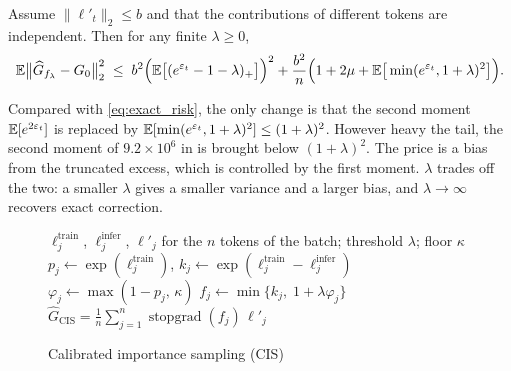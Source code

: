 \begin{theorem}[Informal]
\label{thm:cis_risk}
Assume $\|\ell'_t\|_2\le b$ and that the contributions of different tokens are
independent. Then for any finite $\lambda\ge0$,
\begin{equation}
\mathbb{E}\big\|\widehat G_{f_{\lambda}}-G_0\big\|_2^2
\;\le\;
b^2\Big(\mathbb{E}\big[(e^{\varepsilon_t}-1-\lambda)_+\big]\Big)^2
+\frac{b^2}{n}\Big(1+2\mu+\mathbb{E}\big[\min(e^{\varepsilon_t},1+\lambda)^2\big]\Big).
\label{eq:cis_risk}
\end{equation}
\end{theorem}

Compared with \eqref{eq:exact_risk}, the only change is that the second moment
$\mathbb{E}[e^{2\varepsilon_t}]$ is replaced by
$\mathbb{E}[\min(e^{\varepsilon_t},1+\lambda)^2]\le(1+\lambda)^2$. However heavy the
tail, the second moment of $9.2\times10^{6}$ in  is brought below
$(1+\lambda)^2$. The price is a bias from the truncated excess, which is
controlled by the first moment. $\lambda$ trades off the two: a smaller
$\lambda$ gives a smaller variance and a larger bias, and $\lambda\to\infty$
recovers exact correction.

\begin{figure}
\vspace{-\baselineskip}
\begin{minipage}{0.5\textwidth}
\begin{algorithm}[H]
\caption{Calibrated importance sampling (CIS)}
\label{alg:cis}
\begin{algorithmic}[1]
\Require $\ell^{\mathrm{train}}_j$, $\ell^{\mathrm{infer}}_j$, $\ell'_j$ for
the $n$ tokens of the batch; threshold $\lambda$; floor $\kappa$
  \State $p_j\gets\exp(\ell^{\mathrm{train}}_j)$,\quad
  $k_j\gets\exp(\ell^{\mathrm{train}}_j-\ell^{\mathrm{infer}}_j)$
  \State $\varphi_j\gets\max(1-p_j,\,\kappa)$
  \State $f_j\gets\min\big\{k_j,\;1+\lambda\varphi_j\big\}$
\EndFor
\State \Return $\widehat G_{\mathrm{CIS}}
=\frac{1}{n}\sum_{j=1}^{n}\operatorname{stopgrad}(f_j)\,\ell'_j$
\end{algorithmic}
\end{algorithm}
\end{minipage}
\end{figure}

